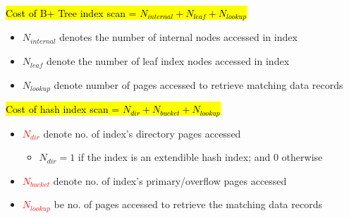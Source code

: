\documentclass[10pt,landscape]{article}
\newcommand{\1}{\mathmybb{1}}
\begin{document}
\begin{multicols*}{3}
\hl{Cost of B+ Tree index scan = $N_{internal} + N_{leaf} + N_{lookup}$}
\begin{itemize}
    \item $N_{internal}$ denotes the number of internal nodes accessed in index
    \item $N_{leaf}$ denote the number of leaf index nodes accessed in index
    \item $N_{lookup}$ denote number of pages accessed to retrieve matching data records 
\end{itemize}

\hl{Cost of hash index scan = $N_{dir} + N_{bucket} + N_{lookup}$}
\begin{itemize}
    \item \textcolor{red}{$N_{dir}$} denote no. of index's directory pages accessed
    \begin{itemize}
        \item $N_{dir} = 1$ if the index is an extendible hash index; and 0 otherwise
    \end{itemize}
    \item \textcolor{red}{$N_{bucket}$} denote no. of index's primary/overflow pages accessed
    \item \textcolor{red}{$N_{lookup}$} be no. of pages accessed to retrieve the matching data records
\end{itemize}



\end{multicols*}
\end{document}
